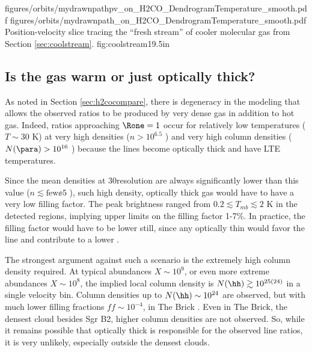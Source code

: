 \RotFigureTwoAA
{figures/orbits/mydrawnpathpv_on_H2CO_DendrogramTemperature_smooth.pdf}
{figures/orbits/mydrawnpath_on_H2CO_DendrogramTemperature_smooth.pdf}
{Position-velocity slice tracing the ``fresh stream'' of cooler molecular
gas from Section \ref{sec:coolstream}.}
{fig:coolstream}{1}{9.5in}

\subsection{Is the gas warm or just optically thick?}
As noted in Section \ref{sec:h2cocompare}, there is degeneracy in the modeling
that allows the observed ratios to be produced by very dense gas in addition to
hot gas.  Indeed, ratios approaching $\Rone=1$ occur for relatively low
temperatures ($T\sim30$ K) at very high densities ($n>10^{6.5}$ \percc)
and very high column densities ($N(\para)>10^{16}$ \perkms \persc) because
the lines become optically thick and have LTE temperatures.

Since the mean densities at 30\arcsec resolution are always significantly lower
than this value ($n\lesssim\mathrm{few}\ee{5}$ \percc), such high density,
optically thick gas would have to have a very low filling factor.  The peak
\para \threeohthree brightness ranged from $0.2 \lesssim T_{mb} \lesssim 2$ K
in the detected regions, implying upper limits on the filling factor 1-7\%.
In practice, the filling factor would have to be lower still, since any optically
thin \para would favor the \threeohthree line and contribute to a lower \Rone.

The strongest argument against such a scenario is the extremely high column
density required.  At typical \para abundances $X\sim10^9$, or even more
extreme abundances $X\sim10^8$, the implied local column density is
$N(\hh)\gtrsim10^{25(24)}$ in a single velocity bin.  Column densities up to
$N(\hh)\sim10^{24}$ \percc are observed, but with much lower filling fractions
$ff\sim10^{-4}$, in The Brick \citep[][Figure 4]{Rathborne2014a}.  Even in The
Brick, the densest cloud besides Sgr B2, higher column densities are not
observed.  So, while it remains possible that optically thick \para is
responsible for the observed line ratios, it is very unlikely, especially
outside the densest clouds.



